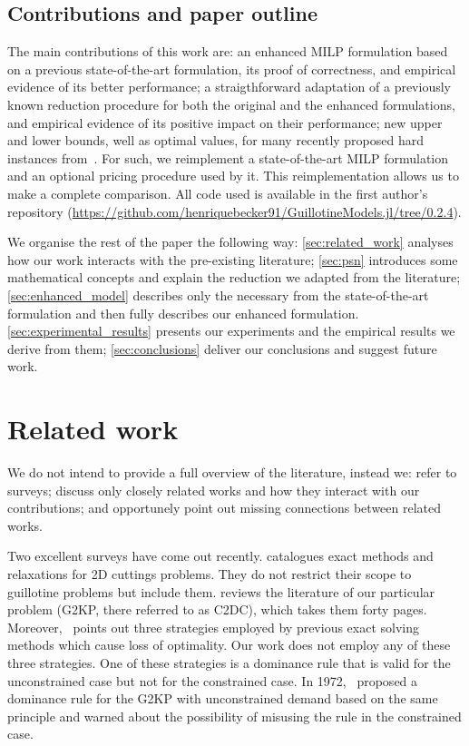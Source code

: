 \documentclass[smallextended]{svjour3}       %
\begin{document}
\subsection{Contributions and paper outline}

The main contributions of this work are:
an enhanced MILP formulation based on a previous state-of-the-art formulation, its proof of correctness, and empirical evidence of its better performance;
a straigthforward adaptation of a previously known reduction procedure for both the original and the enhanced formulations, and empirical evidence of its positive impact on their performance;
new upper and lower bounds, well as optimal values, for many recently proposed hard instances from~\cite{velasco:2019}.
For such, we reimplement a state-of-the-art MILP formulation and an optional pricing procedure used by it.
This reimplementation allows us to make a complete comparison.
All code used is available in the first author's repository ({\small\url{https://github.com/henriquebecker91/GuillotineModels.jl/tree/0.2.4}}).

We organise the rest of the paper the following way:
\autoref{sec:related_work} analyses how our work interacts with the pre-existing literature;
\autoref{sec:psn} introduces some mathematical concepts and explain the reduction we adapted from the literature;
\autoref{sec:enhanced_model} describes only the necessary from the state-of-the-art formulation and then fully describes our enhanced formulation.
\autoref{sec:experimental_results} presents our experiments and the empirical results we derive from them;
\autoref{sec:conclusions} deliver our conclusions and suggest future work.

\section{Related work}
\label{sec:related_work}

We do not intend to provide a full overview of the literature, instead we:
refer to surveys; discuss only closely related works and how they interact with our contributions; and opportunely point out missing connections between related works.

Two excellent surveys have come out recently.
\cite{iori:2020} catalogues exact methods and relaxations for 2D cuttings problems.
They do not restrict their scope to guillotine problems but include them.
\cite{russo:2020} reviews the literature of our particular problem (G2KP, there referred to as C2DC), which takes them forty pages.
Moreover, \cite{russo:2020}~points out three strategies employed by previous exact solving methods which cause loss of optimality.
Our work does not employ any of these three strategies.
One of these strategies is a dominance rule that is valid for the unconstrained case but not for the constrained case.
In 1972, \cite{herz:1972}~proposed a dominance rule for the G2KP with unconstrained demand based on the same principle and warned about the possibility of misusing the rule in the constrained case.
\end{document}

